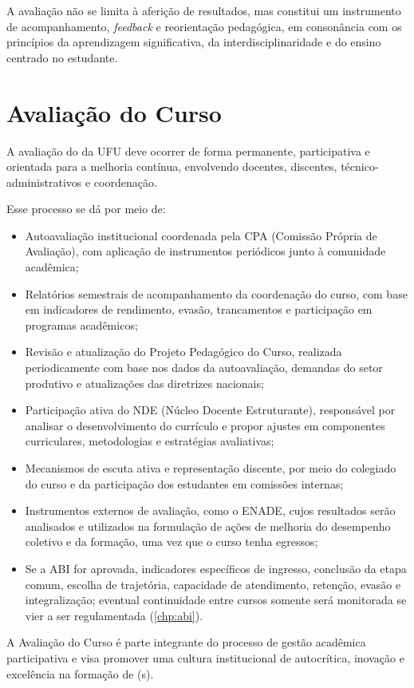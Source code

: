 A avaliação não se limita à aferição de resultados, mas constitui um instrumento de acompanhamento, \textit{feedback} e reorientação pedagógica, em consonância com os princípios da aprendizagem significativa, da interdisciplinaridade e do ensino centrado no estudante.

\section{Avaliação do Curso}

A avaliação do \ppccurso da UFU deve ocorrer de forma permanente, participativa e orientada para a melhoria contínua, envolvendo docentes, discentes, técnico-administrativos e coordenação.

Esse processo se dá por meio de:

\begin{itemize}
    \item Autoavaliação institucional coordenada pela CPA (Comissão Própria de Avaliação), com aplicação de instrumentos periódicos junto à comunidade acadêmica;
    \item Relatórios semestrais de acompanhamento da coordenação do curso, com base em indicadores de rendimento, evasão, trancamentos e participação em programas acadêmicos;
    \item Revisão e atualização do Projeto Pedagógico do Curso, realizada periodicamente com base nos dados da autoavaliação, demandas do setor produtivo e atualizações das diretrizes nacionais;
    \item Participação ativa do NDE (Núcleo Docente Estruturante), responsável por analisar o desenvolvimento do currículo e propor ajustes em componentes curriculares, metodologias e estratégias avaliativas;
    \item Mecanismos de escuta ativa e representação discente, por meio do colegiado do curso e da participação dos estudantes em comissões internas;
    \item Instrumentos externos de avaliação, como o ENADE, cujos resultados serão analisados e utilizados na formulação de ações de melhoria do desempenho coletivo e da formação, uma vez que o curso tenha egressos;
    \item Se a ABI for aprovada, indicadores específicos de ingresso, conclusão da etapa comum, escolha de trajetória, capacidade de atendimento, retenção, evasão e integralização; eventual continuidade entre cursos somente será monitorada se vier a ser regulamentada (\autoref{chp:abi}).
\end{itemize}

A Avaliação do Curso é parte integrante do processo de gestão acadêmica participativa e visa promover uma cultura institucional de autocrítica, inovação e excelência na formação de \ppctitulacao(s).
